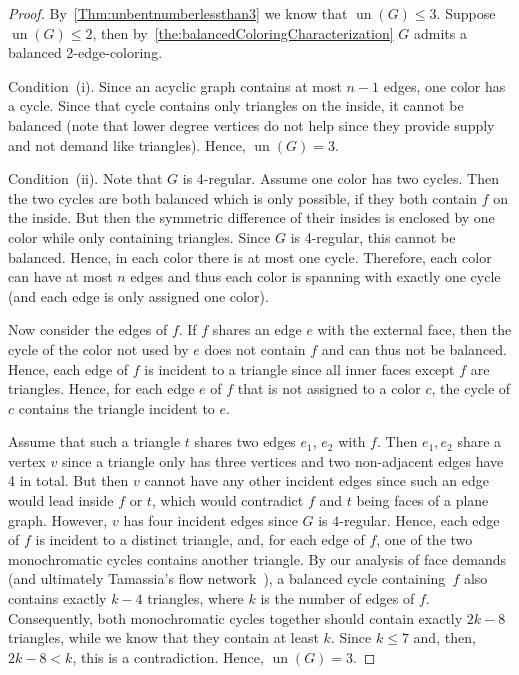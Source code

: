 \documentclass[runningheads]{llncs}
\newcommand{\un}{\operatorname{un}}
\begin{document}
\begin{proof}
  By~\cref{Thm:unbentnumberlessthan3} we know that $\un(G)\le 3$.
  Suppose~$\un(G)\le 2$, then
  by~\cref{the:balancedColoringCharacterization} $G$ admits a balanced
  2-edge-coloring.
  
  Condition~(i). %
  Since an acyclic graph
  contains at most $n-1$ edges, one color has a cycle. Since that
  cycle contains only triangles on the inside, it cannot be balanced
  (note that lower degree vertices do not help since they provide
  supply and not demand like triangles). Hence, $\un(G)=3$.

  Condition~(ii). %
  Note that $G$ is 4-regular.
  Assume one color has two cycles. Then the two cycles are both
  balanced which is only possible, if they both contain $f$ on the
  inside. But then the symmetric difference of their insides is
  enclosed by one color while only containing triangles. Since $G$ is
  4-regular, this cannot be balanced. Hence, in each color there is at
  most one cycle. Therefore, each color can have at most $n$ edges and
  thus each color is spanning with exactly one cycle (and each edge is
  only assigned one color).
   
  Now consider the edges of $f$. If $f$ shares an edge $e$ with the
  external face, then the cycle of the color not used by $e$ does not
  contain $f$ and can thus not be balanced. Hence, each edge of $f$ is
  incident to a triangle since all inner faces except $f$ are
  triangles.  Hence, for each edge $e$ of $f$ that is not assigned to
  a color $c$, the cycle of $c$ contains the triangle incident to $e$.
   
  Assume that such a triangle $t$ shares two edges $e_1$, $e_2$ with
  $f$. Then $e_1,e_2$ share a vertex $v$ since a triangle only has
  three vertices and two non-adjacent edges have 4 in total. But then
  $v$ cannot have any other incident edges since such an edge would
  lead inside $f$ or $t$, which would contradict $f$ and $t$ being
  faces of a plane graph.
  However, $v$ has four incident edges since $G$ is
  $4$-regular.  Hence, each edge of $f$ is incident to a distinct
  triangle, and, for each edge of $f$, one of the two monochromatic
  cycles contains another triangle.  By our analysis of face demands
  (and ultimately Tamassia's flow network~\cite{t-oeggwmnb-sjc}),
  a balanced cycle containing~$f$ also contains exactly $k-4$ triangles,
  where $k$ is the number of edges of $f$. Consequently, both
  monochromatic cycles together should contain exactly $2k-8$ triangles,
  while we know that they contain at least $k$.
  Since $k\le7$ and, then, $2k - 8 < k$, this is a contradiction.
  Hence, $\un(G)=3$.
\end{proof}
\end{document}

